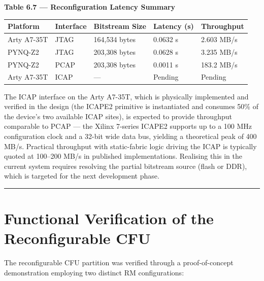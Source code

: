 \textbf{Table 6.7 — Reconfiguration Latency Summary}

\begin{table}[htbp]
\centering
\begin{tabularx}{\textwidth}{X X X X X}
\toprule
Platform & Interface & Bitstream Size & Latency (s) & Throughput \\
\midrule
Arty A7-35T & JTAG & 164,534 bytes & 0.0632 s & 2.603 MB/s \\
PYNQ-Z2 & JTAG & 203,308 bytes & 0.0628 s & 3.235 MB/s \\
PYNQ-Z2 & PCAP & 203,308 bytes & 0.0011 s & 183.2 MB/s \\
Arty A7-35T & ICAP & — & Pending & Pending \\
\bottomrule
\end{tabularx}
\end{table}

The ICAP interface on the Arty A7-35T, which is physically implemented and verified in the design (the ICAPE2 primitive is instantiated and consumes 50\% of the device's two available ICAP sites), is expected to provide throughput comparable to PCAP — the Xilinx 7-series ICAPE2 supports up to a 100 MHz configuration clock and a 32-bit wide data bus, yielding a theoretical peak of 400 MB/s. Practical throughput with static-fabric logic driving the ICAP is typically quoted at 100–200 MB/s in published implementations. Realising this in the current system requires resolving the partial bitstream source (flash or DDR), which is targeted for the next development phase.

\vspace{0.4em}\hrule\vspace{0.4em}

\section{Functional Verification of the Reconfigurable CFU}

The reconfigurable CFU partition was verified through a proof-of-concept demonstration employing two distinct RM configurations:

